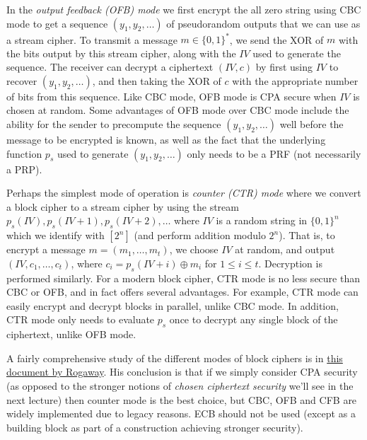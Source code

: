 In the \emph{output feedback (OFB) mode} we first encrypt the all zero
string using CBC mode to get a sequence \((y_1,y_2,\ldots)\) of
pseudorandom outputs that we can use as a stream cipher. To transmit a
message \(m \in \{0,1\}^*\), we send the XOR of \(m\) with the bits
output by this stream cipher, along with the
\(\ensuremath{\mathit{IV}}\) used to generate the sequence. The receiver
can decrypt a ciphertext \((\ensuremath{\mathit{IV}}, c)\) by first
using \(\ensuremath{\mathit{IV}}\) to recover \((y_1, y_2, \ldots)\),
and then taking the XOR of \(c\) with the appropriate number of bits
from this sequence. Like CBC mode, OFB mode is CPA secure when
\(\ensuremath{\mathit{IV}}\) is chosen at random. Some advantages of OFB
mode over CBC mode include the ability for the sender to precompute the
sequence \((y_1, y_2, \ldots)\) well before the message to be encrypted
is known, as well as the fact that the underlying function \(p_s\) used
to generate \((y_1, y_2, \ldots)\) only needs to be a PRF (not
necessarily a PRP).

Perhaps the simplest mode of operation is \emph{counter (CTR) mode}
where we convert a block cipher to a stream cipher by using the stream
\(p_s(\ensuremath{\mathit{IV}}),p_s(\ensuremath{\mathit{IV}}+1),p_s(\ensuremath{\mathit{IV}}+2),\ldots\)
where \(\ensuremath{\mathit{IV}}\) is a random string in \(\{0,1\}^n\)
which we identify with \([2^n]\) (and perform addition modulo \(2^n\)).
That is, to encrypt a message \(m = (m_1, \ldots, m_t)\), we choose
\(\ensuremath{\mathit{IV}}\) at random, and output
\((\ensuremath{\mathit{IV}}, c_1, \ldots, c_t)\), where
\(c_i = p_s(\ensuremath{\mathit{IV}} + i) \oplus m_i\) for
\(1 \le i \le t\). Decryption is performed similarly. For a modern block
cipher, CTR mode is no less secure than CBC or OFB, and in fact offers
several advantages. For example, CTR mode can easily encrypt and decrypt
blocks in parallel, unlike CBC mode. In addition, CTR mode only needs to
evaluate \(p_s\) once to decrypt any single block of the ciphertext,
unlike OFB mode.

A fairly comprehensive study of the different modes of block ciphers is
in \href{http://web.cs.ucdavis.edu/~rogaway/papers/modes.pdf}{this
document by Rogaway}. His conclusion is that if we simply consider CPA
security (as opposed to the stronger notions of \emph{chosen ciphertext
security} we'll see in the next lecture) then counter mode is the best
choice, but CBC, OFB and CFB are widely implemented due to legacy
reasons. ECB should not be used (except as a building block as part of a
construction achieving stronger security).

